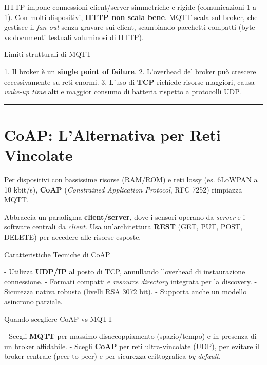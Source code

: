 \documentclass[
  italian,
  openany]{book}
\begin{document}
HTTP impone connessioni client/server simmetriche e rigide
(comunicazioni 1-a-1). Con molti dispositivi, \textbf{HTTP non scala
bene}. MQTT scala sul broker, che gestisce il \emph{fan-out} senza
gravare sui client, scambiando pacchetti compatti (byte vs documenti
testuali voluminosi di HTTP).

\begin{calloutwarning}{Limiti strutturali di MQTT}

1. Il broker è un \textbf{single point of failure}. 2. L'overhead del
broker può crescere eccessivamente su reti enormi. 3. L'uso di
\textbf{TCP} richiede risorse maggiori, causa \emph{wake-up time} alti e
maggior consumo di batteria rispetto a protocolli UDP.

\end{calloutwarning}

\begin{center}\rule{0.5\linewidth}{0.5pt}\end{center}

\section{CoAP: L'Alternativa per Reti
Vincolate}\label{coap-lalternativa-per-reti-vincolate}

Per dispositivi con bassissime risorse (RAM/ROM) e reti lossy (es.
6LoWPAN a 10 kbit/s), \textbf{CoAP} (\emph{Constrained Application
Protocol}, RFC 7252) rimpiazza MQTT.

Abbraccia un paradigma \textbf{client/server}, dove i sensori operano da
\emph{server} e i software centrali da \emph{client}. Usa
un'architettura \textbf{REST} (GET, PUT, POST, DELETE) per accedere alle
risorse esposte.

\begin{calloutnote}{Caratteristiche Tecniche di CoAP}

- Utilizza \textbf{UDP/IP} al posto di TCP, annullando l'overhead di
instaurazione connessione. - Formati compatti e \emph{resource
directory} integrata per la discovery. - Sicurezza nativa robusta
(livelli RSA 3072 bit). - Supporta anche un modello asincrono parziale.

\end{calloutnote}

\begin{callouttip}{Quando scegliere CoAP vs MQTT}

- Scegli \textbf{MQTT} per massimo disaccoppiamento (spazio/tempo) e in
presenza di un broker affidabile. - Scegli \textbf{CoAP} per reti
ultra-vincolate (UDP), per evitare il broker centrale (peer-to-peer) e
per sicurezza crittografica \emph{by default}.

\end{callouttip}
\end{document}
